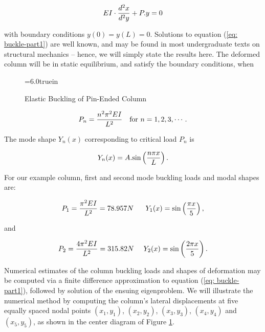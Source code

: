 \begin{equation}
EI \cdot {{d^2x} \over {d^2y}} + P.y = 0
\label{eq: buckle-part1}
\end{equation}

\vspace{0.10 in}\noindent
with boundary conditions $y(0) = y(L) = 0$.
Solutions to equation (\ref{eq: buckle-part1}) are well known,
and may be found in most undergraduate texts on structural mechanics --
hence, we will simply state the results here.
The deformed column will be in static equilibrium,
and satisfy the boundary conditions, when

\begin{figure} [t]
\epsfxsize=6.0truein
\centerline{}
\caption{Elastic Buckling of Pin-Ended Column}
\label{fig:buckling-of-rod1}
\end{figure}

\begin{equation}
P_n = {{n^2 \pi^2 EI } \over {L^2}} ~~~ \hbox{for} ~ n = 1,2,3, \cdots.
\label{eq: buckle-part2}
\end{equation}

\vspace{0.10 in}\noindent
The mode shape $Y_n(x)$ corresponding to critical load $P_n$ is

\begin{equation}
Y_n (x) = A . \hbox{sin} \left( {{n \pi x} \over L} \right).
\label{eq: buckle-part3}
\end{equation}

\vspace{0.15 in}\noindent
For our example column, first and second mode buckling loads and modal shapes are:

\begin{equation}
P_1 = {{\pi^2 EI} \over L^2} = 78.957 N ~~~~~
Y_1(x) = \hbox{sin} \left( {{\pi x} \over 5} \right),
\label{eq: buckle-part4}
\end{equation}

\noindent
and

\begin{equation}
P_2 = {{4 {\pi^2 EI}} \over L^2} = 315.82 N ~~~~
Y_2(x) = \hbox{sin} \left( {{2 \pi x} \over 5} \right).
\label{eq: buckle-part5}
\end{equation}

\vspace{0.15 in}\noindent
Numerical estimates of the column buckling loads and 
shapes of deformation may be computed via a finite
difference approximation to equation (\ref{eq: buckle-part1}),
followed by solution of the ensuing eigenproblem.
We will illustrate the numerical method by computing
the column's lateral displacements at five equally
spaced nodal points $(x_1,y_1)$, $(x_2,y_2)$, $(x_3,y_3)$, $(x_4,y_4)$ and $(x_5,y_5)$,
as shown in the center diagram of Figure \ref{fig:buckling-of-rod1}.

